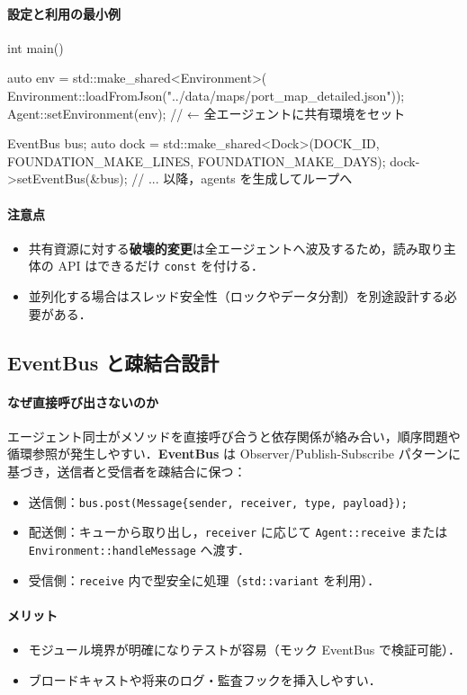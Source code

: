 \documentclass[10pt,letterpaper]{jsarticle}
\begin{document}
\paragraph{設定と利用の最小例}
\begin{cppcode}
int main() {
    auto env = std::make_shared<Environment>(
        Environment::loadFromJson("../data/maps/port_map_detailed.json"));
    Agent::setEnvironment(env); // ← 全エージェントに共有環境をセット

    EventBus bus;
    auto dock = std::make_shared<Dock>(DOCK_ID, FOUNDATION_MAKE_LINES, FOUNDATION_MAKE_DAYS);
    dock->setEventBus(&bus);
    // ... 以降，agents を生成してループへ
}
\end{cppcode}

\paragraph{注意点}
\begin{itemize}
\item 共有資源に対する\textbf{破壊的変更}は全エージェントへ波及するため，読み取り主体の API はできるだけ \texttt{const} を付ける．
\item 並列化する場合はスレッド安全性（ロックやデータ分割）を別途設計する必要がある．
\end{itemize}

\subsection{EventBus と疎結合設計}
\paragraph{なぜ直接呼び出さないのか}
エージェント同士がメソッドを直接呼び合うと依存関係が絡み合い，順序問題や循環参照が発生しやすい．\textbf{EventBus} は Observer/Publish-Subscribe パターンに基づき，送信者と受信者を疎結合に保つ：
\begin{itemize}
\item 送信側：\texttt{bus.post(Message\{sender, receiver, type, payload\});}
\item 配送側：キューから取り出し，\texttt{receiver} に応じて \texttt{Agent::receive} または \texttt{Environment::handleMessage} へ渡す．
\item 受信側：\texttt{receive} 内で型安全に処理（\texttt{std::variant} を利用）．
\end{itemize}

\paragraph{メリット}
\begin{itemize}
\item モジュール境界が明確になりテストが容易（モック EventBus で検証可能）．
\item ブロードキャストや将来のログ・監査フックを挿入しやすい．
\end{itemize}
\end{document}

